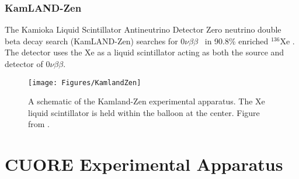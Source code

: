 \documentclass[12pt,a4paper]{article}
\newcommand{\zeronubb}{$0\nu \beta \beta$}
\begin{document}
\subsubsection*{KamLAND-Zen}
The Kamioka Liquid Scintillator Antineutrino Detector Zero neutrino double beta decay search (KamLAND-Zen) searches for \zeronubb~ in 90.8\% enriched $^{136}$Xe \cite{KamLAND-Zen:2016pfg}. The detector uses the Xe as a liquid scintillator acting as both the source and detector of \zeronubb.

\begin{figure}[tbph]
\centering
\texttt{[image: Figures/KamlandZen]}
\caption{A schematic of the Kamland-Zen experimental apparatus. The Xe liquid scintillator is held within the balloon at the center. Figure from \cite{::2015uaa}.}
\label{fig:kamlandzen}
\end{figure}

\begin{comment}
\begin{table}[htbp]
\centering
\begin{tabular}{|c|c|c|c|}
\hline 
Experiment & Isotope & \zeronubb~ Half-Life (yr) & Q-Value (keV) \\ 
\hline 
Gerda & $^{76}$Ge & $>5.2 \times 10^{25}$ & 2039 \\ 
\hline 
EXO-200 & $^{136}$Xe & $>1.1 \times 10^{25}$ & 2458 \\ 
\hline 
NEMO &  &  \\ 
\hline 
Majorana &  &  \\ 
\hline 
Heidelburg-Moscow &  &  \\ 
\hline 
Kamland-Zen &  &  \\ 
\hline 
CUORE &  & 2528 \\ 
\hline 
\end{tabular} 
\end{table}
\end{comment}

\section{CUORE Experimental Apparatus}
\end{document}

